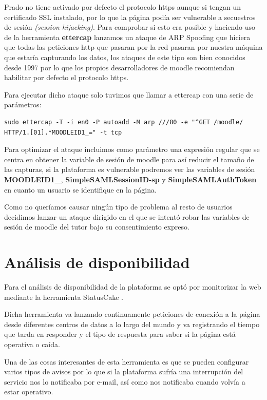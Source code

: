 \bigskip
Prado no tiene activado por defecto el protocolo https aunque si tengan un certificado SSL instalado, por lo que la página podía ser vulnerable a secuestros de sesión \textit{(session hijacking)}. Para comprobar si esto era posible y haciendo uso de la herramienta \textbf{ettercap} lanzamos un ataque de ARP Spoofing\cite{art_08} que hiciera que todas las peticiones http que pasaran por la red pasaran por nuestra máquina que estaría capturando los datos, los ataques de este tipo son bien conocidos desde 1997\cite{art_07} por lo que los propios desarrolladores de moodle recomiendan habilitar por defecto el protocolo https\cite{art_10}.

\bigskip
Para ejecutar dicho ataque solo tuvimos que llamar a ettercap con una serie de parámetros:

\begin{lstlisting}
sudo ettercap -T -i en0 -P autoadd -M arp ///80 -e "^GET /moodle/ HTTP/1.[01].*MOODLEID1_=" -t tcp
\end{lstlisting}

Para optimizar el ataque incluimos como parámetro una expresión regular que se centra en obtener la variable de sesión de moodle para así reducir el tamaño de las capturas, si la plataforma es vulnerable podremos ver las variables de sesión \textbf{MOODLEID1\_}, \textbf{SimpleSAMLSessionID-sp} y \textbf{SimpleSAMLAuthToken} en cuanto un usuario se identifique en la página.

\bigskip
Como no queríamos causar ningún tipo de problema al resto de usuarios decidimos lanzar un ataque dirigido en el que se intentó robar las variables de sesión de moodle del tutor bajo su consentimiento expreso.

\section{Análisis de disponibilidad}

Para el análisis de  disponibilidad de la plataforma se optó por monitorizar la web mediante la herramienta StatusCake \cite{statuscake}.

\bigskip
Dicha herramienta va lanzando continuamente peticiones de conexión a la página desde diferentes centros de datos a lo largo del mundo y va registrando el tiempo que tarda en responder y el tipo de respuesta para saber si la página está operativa o caída.

\bigskip
Una de las cosas interesantes de esta herramienta es que se pueden configurar varios tipos de avisos por lo que si la plataforma sufría una interrupción del servicio nos lo notificaba por e-mail, así como nos notificaba cuando volvía a estar operativo.



